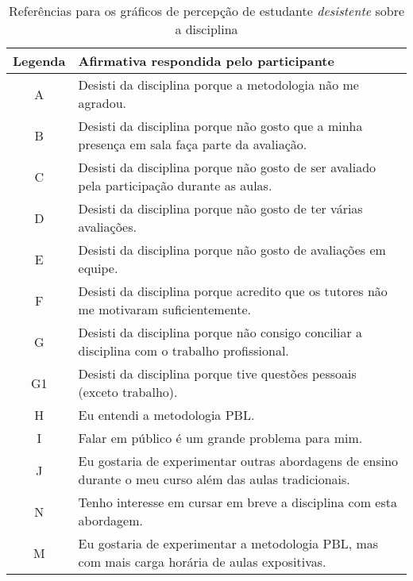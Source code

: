 \begin{table}[h]
\caption{Referências para os gráficos de percepção de estudante \textit{desistente} sobre a disciplina}
\label{tabela-ref-graficos3}
\begin{tabular}{c|p{14.6cm}}
Legenda & Afirmativa respondida pelo participante \\
\hline
A & Desisti da disciplina porque a metodologia não me agradou.\\
\hline
B & Desisti da disciplina porque não gosto que a minha presença em sala faça parte da avaliação.\\
\hline
C & Desisti da disciplina porque não gosto de ser avaliado pela participação durante as aulas.\\
\hline
D & Desisti da disciplina porque não gosto de ter várias avaliações.\\
\hline
E & Desisti da disciplina porque não gosto de avaliações em equipe.\\
\hline
F & Desisti da disciplina porque acredito que os tutores não me motivaram suficientemente.\\
\hline
G & Desisti da disciplina porque não consigo conciliar a disciplina com o trabalho profissional.\\
\hline
G1 & Desisti da disciplina porque tive questões pessoais (exceto trabalho).\\
\hline
H & Eu entendi a metodologia PBL.\\
\hline
I & Falar em público é um grande problema para mim.\\
\hline
J & Eu gostaria de experimentar outras abordagens de ensino durante o meu curso além das aulas tradicionais.\\
\hline
N & Tenho interesse em cursar em breve a disciplina com esta abordagem.\\
\hline
M & Eu gostaria de experimentar a metodologia PBL, mas com mais carga horária de aulas expositivas.\\
\end{tabular}
\end{table}
